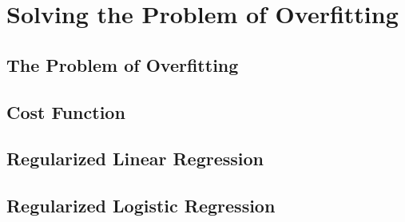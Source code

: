 \documentclass{article}
\begin{document}
\begin{CJK}{UTF8}{gbsn}
\subparagraph*{}
\section{Solving the Problem of Overfitting}
\subsection{The Problem of Overfitting}
\subsection{Cost Function}
\subsection{Regularized Linear Regression}
\subsection{Regularized Logistic Regression}
\end{CJK}
\end{document}
